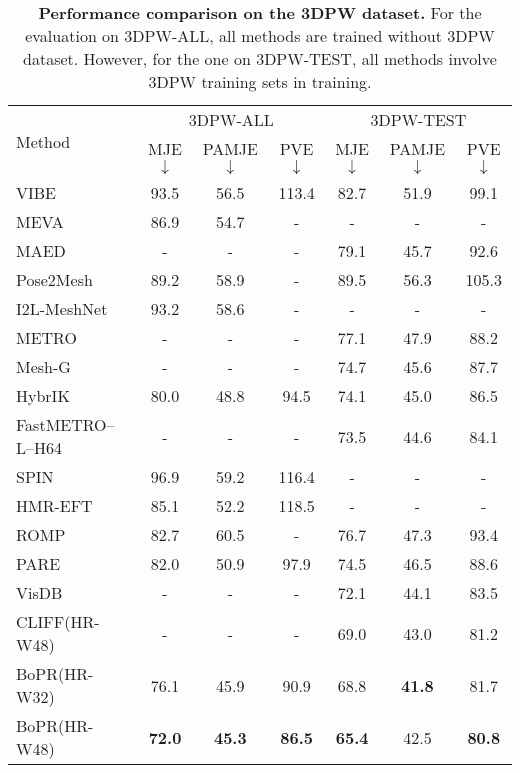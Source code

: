 \documentclass[10pt,twocolumn,letterpaper]{article}
\begin{document}
\begin{table*}
	\centering
\begin{tabular}{lcccccc}
        \toprule[1.5pt]
		\multirow{2}{*}{Method} & \multicolumn{3}{c}{3DPW-ALL}   & \multicolumn{3}{c}{3DPW-TEST} \\
		& MJE$\downarrow$ & PAMJE$\downarrow$ & PVE$\downarrow$ & MJE$\downarrow$ & PAMJE$\downarrow$ & PVE$\downarrow$  \\ \hline
		VIBE~\cite{kocabas2020vibe} & 93.5 & 56.5 & 113.4 &82.7 &51.9 &99.1\\ 
		MEVA~\cite{luo20203d} & 86.9 & 54.7 & - &- &- &- \\
  MAED~\cite{wan2021encoder} & - & - & - &79.1 & 45.7 &92.6 \\ 
  \hline
		Pose2Mesh~\cite{choi2020pose2mesh} & 89.2 & 58.9 & -& 89.5 & 56.3&105.3 \\
		I2L-MeshNet~\cite{moon2020i2l} & 93.2 & 58.6 & - & -& -&- \\
            METRO~\cite{lin2021end} &- &- &- &77.1 &47.9 &88.2\\
            Mesh-G~\cite{lin2021mesh} &- &- &- &74.7 &45.6 &87.7\\
            HybrIK~\cite{li2021hybrik} & 80.0 & 48.8 & 94.5 & 74.1 & 45.0 & 86.5\\
            FastMETRO–L–H64~\cite{cho2022cross} &- &- &- &73.5 &44.6 &84.1\\
            \hline
		SPIN~\cite{kolotouros2019learning} & 96.9 & 59.2 &116.4 & -& -&-\\
		HMR-EFT~\cite{joo2020exemplar} &85.1 & 52.2 & 118.5 &- &- &-\\
		ROMP~\cite{sun2021monocular} & 82.7 & 60.5 & - & 76.7 & 47.3 & 93.4\\
		PARE~\cite{kocabas2021pare} & 82.0 & 50.9 & 97.9 & 74.5 & 46.5 & 88.6\\ 
            VisDB~\cite{yao2022learning} &- &- &- & 72.1 &44.1 &83.5\\
            CLIFF(HR-W48)~\cite{li2022cliff} & - & - & - & 69.0 & 43.0 & 81.2\\ \hline
		BoPR(HR-W32) & 76.1 & 45.9 & 90.9 & 68.8 & \textbf{41.8} & 81.7  \\
BoPR(HR-W48) & \textbf{72.0} & \textbf{45.3} & \textbf{86.5} & \textbf{65.4} & 42.5 & \textbf{80.8} \\ 
        \bottomrule[1.5pt]
	\end{tabular}
\caption{\textbf{Performance comparison on the 3DPW dataset.} For the evaluation on 3DPW-ALL, all methods are trained without 3DPW dataset. However, for the one on 3DPW-TEST, all methods involve 3DPW training sets in training. }
\label{tab:3dpw}
\end{table*}
\end{document}
